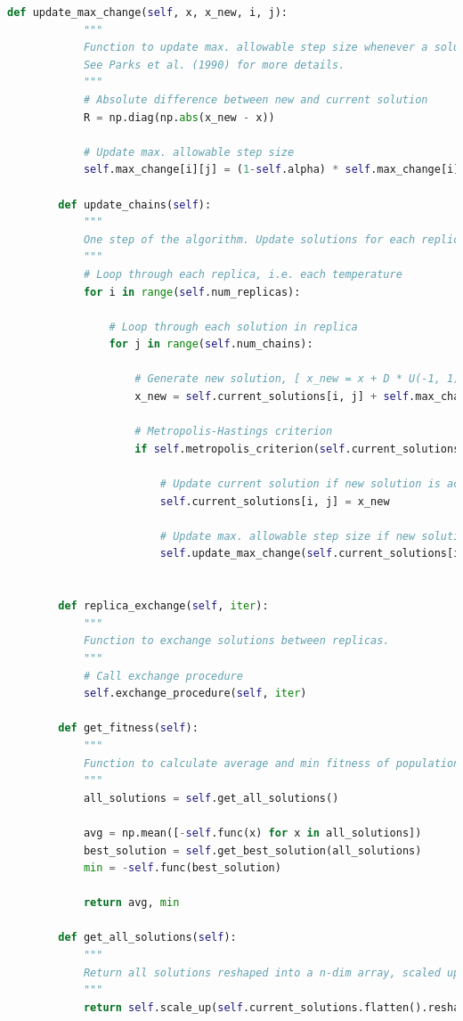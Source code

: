 \documentclass[10pt]{article}
\begin{document}
\begin{lstlisting}[language=Python, caption=PT.py, label=PTpy]
        def update_max_change(self, x, x_new, i, j):
            """
            Function to update max. allowable step size whenever a solution is accepted.
            See Parks et al. (1990) for more details.
            """
            # Absolute difference between new and current solution
            R = np.diag(np.abs(x_new - x)) 
    
            # Update max. allowable step size
            self.max_change[i][j] = (1-self.alpha) * self.max_change[i][j] + self.alpha * self.omega * R
    
        def update_chains(self):
            """
            One step of the algorithm. Update solutions for each replica. Easily parallelisable.
            """
            # Loop through each replica, i.e. each temperature
            for i in range(self.num_replicas):
    
                # Loop through each solution in replica
                for j in range(self.num_chains):
    
                    # Generate new solution, [ x_new = x + D * U(-1, 1) ], where D is max. allowable step size
                    x_new = self.current_solutions[i, j] + self.max_change[i][j] @ np.random.uniform(-1, 1, self.x_dim)
    
                    # Metropolis-Hastings criterion
                    if self.metropolis_criterion(self.current_solutions[i, j], x_new, self.temperature_schedule[i]):
                        
                        # Update current solution if new solution is accepted
                        self.current_solutions[i, j] = x_new
    
                        # Update max. allowable step size if new solution is accepted
                        self.update_max_change(self.current_solutions[i, j], x_new, i, j)
            
    
        def replica_exchange(self, iter):
            """
            Function to exchange solutions between replicas.
            """
            # Call exchange procedure
            self.exchange_procedure(self, iter)
        
        def get_fitness(self):
            """
            Function to calculate average and min fitness of population. Fitness is negative of objective function.
            """
            all_solutions = self.get_all_solutions()
            
            avg = np.mean([-self.func(x) for x in all_solutions])
            best_solution = self.get_best_solution(all_solutions)
            min = -self.func(best_solution)
    
            return avg, min
    
        def get_all_solutions(self):
            """
            Return all solutions reshaped into a n-dim array, scaled up to original range of problem.
            """
            return self.scale_up(self.current_solutions.flatten().reshape(-1, self.x_dim))    
\end{lstlisting}
\end{document}
